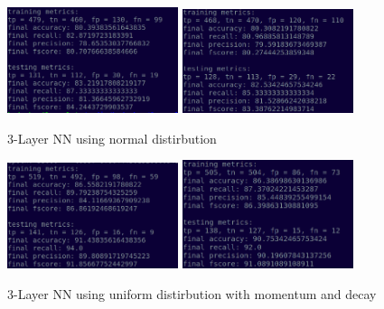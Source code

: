 \documentclass[a4paper,10pt,twoside]{article}
\begin{document}
\begin{figure}[h!]
\centering
\includegraphics[scale=1.0, width=5cm]{Fig7.png}
\includegraphics[scale=1.0, width=5cm]{Fig8.png}
\caption*{3-Layer NN using normal distirbution}
\end{figure}

\begin{figure}[h!]
\centering
\includegraphics[scale=1.0, width=5cm]{Fig9.png}
\includegraphics[scale=1.0, width=5cm]{Fig10.png}
\caption*{3-Layer NN using uniform distirbution with momentum and decay}
\end{figure}


\newpage
\onecolumn
\end{document}
